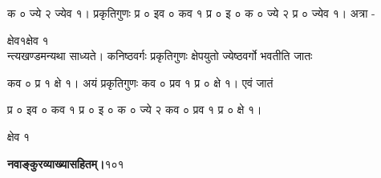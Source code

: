 \documentclass[11pt, openany]{book}
\begin{document}
\begin{sloppypar}
\hangindent=0.2in क ० ज्ये २ ज्येव १। प्रकृतिगुणः प्र ० इव ० कव १ प्र ० इ ० क ० ज्ये २ प्र ० ज्येव १। अत्रा -

क्षेव\hspace{0.3in}१\hspace{4.25in}क्षेव १\\

\hangindent=0.2in न्त्यखण्डमन्यथा साध्यते। कनिष्ठवर्गः प्रकृतिगुणः क्षेपयुतो ज्येष्ठवर्गो भवतीति जातः

कव ० प्र १ क्षे १। अयं प्रकृतिगुणः कव ० प्रव १ प्र ० क्षे १। एवं जातं

\hspace{0.5in}प्र ० इव ० कव १ प्र ० इ ० क ० ज्ये २ कव ० प्रव १ प्र ० क्षे १।

\hspace{4.25in}क्षेव १
\end{sloppypar}
\thispagestyle{empty}
\newpage

\onehalfspacing
\hspace{2in}\textbf{नवाङ्कुरव्याख्यासहितम्।}\hspace{2in}१०१

\vspace{5mm}
\end{document}
